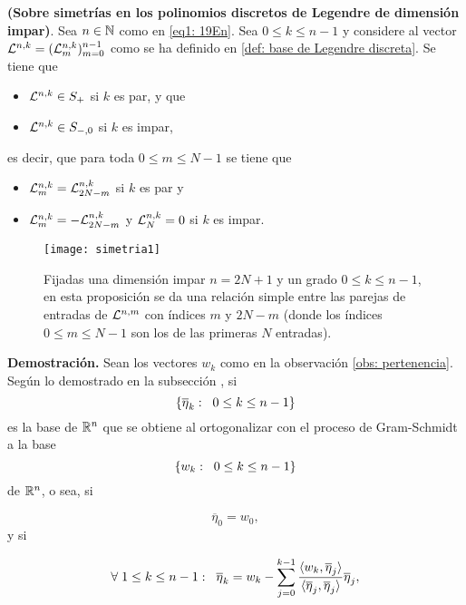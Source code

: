 \begin{teo}
\label{prop: simetrias en dimensiones impares}
\textbf{(Sobre simetrías
en los polinomios discretos de Legendre de dimensión impar)}. 
Sea $n \in \mathbb{N}$ como en \eqref{eq1: 19En}.
Sea $0 \leq k \leq n-1$ y
considere al vector $\mathcal{L}^{n,k}=(\mathcal{L}^{n,k}_{m})_{m=0}^{n-1}$
como se ha definido en \eqref{def: base de Legendre discreta}. 
Se tiene que 
\begin{itemize}
\item $\mathcal{L}^{n,k} \in S_{+}$ si $k$ es par, y que
\item $\mathcal{L}^{n,k} \in S_{-,0}$ si $k$ es impar,
\end{itemize}
es decir, que para toda $0 \leq m \leq N-1$ se tiene que
\begin{itemize}
\item $\mathcal{L}^{n,k}_{m} = \mathcal{L}^{n,k}_{2N-m}$ si $k$ es par y
\item $\mathcal{L}^{n,k}_{m} = -\mathcal{L}^{n,k}_{2N-m}$ y 
$\mathcal{L}^{n, k}_{N}=0$ si $k$ es impar.
\end{itemize}

\begin{figure}[H]
\centering\captionsetup{format = hang}
	\begin{measuredfigure}
		\texttt{[image: simetria1]} 
		\caption{Fijadas una dimensión impar $n=2N+1$ 
		y un grado $0 \leq k \leq n-1$,
		en esta proposición se da una relación simple entre las parejas 
		de entradas de $\mathcal{L}^{n,m}$ con índices $m$ y $2N-m$ 
		(donde los índices $0 \leq m \leq N-1$ son los de las primeras
		$N$ entradas).}
 	\end{measuredfigure}
 \end{figure}
\end{teo}

\noindent
\textbf{Demostración.}
Sean los vectores $w_{k}$ como en la observación 
\ref{obs: pertenencia}.
Según lo demostrado en la subsección , si
\[
\{ \overline{\eta}_{k} : \hspace{0.2cm} 0 \leq k \leq n-1 \}
\]
es la base de $\mathbb{R}^{n}$ que se obtiene al ortogonalizar 
con el proceso de Gram-Schmidt a la base
\[
\{ w_{k} : \hspace{0.2cm} 0 \leq k \leq n-1 \}
\]
de $\mathbb{R}^{n}$,
o sea, si 

\begin{equation}
\label{eq3: 19En}
\overline{\eta}_{0}= w_{0},
\end{equation}
y si

\begin{equation}
\label{eq3: 19En}
\forall \hspace{0.1cm} 1 \leq k \leq n-1: 
\hspace{0.2cm}
\overline{\eta}_{k}= w_{k}-
\suma{j=0}{k-1}{
\frac{\langle w_{k}, \overline{\eta}_{j} \rangle}
{\langle \overline{\eta}_{j}, \overline{\eta}_{j} \rangle}\overline{\eta}_{j},
}
\end{equation}


